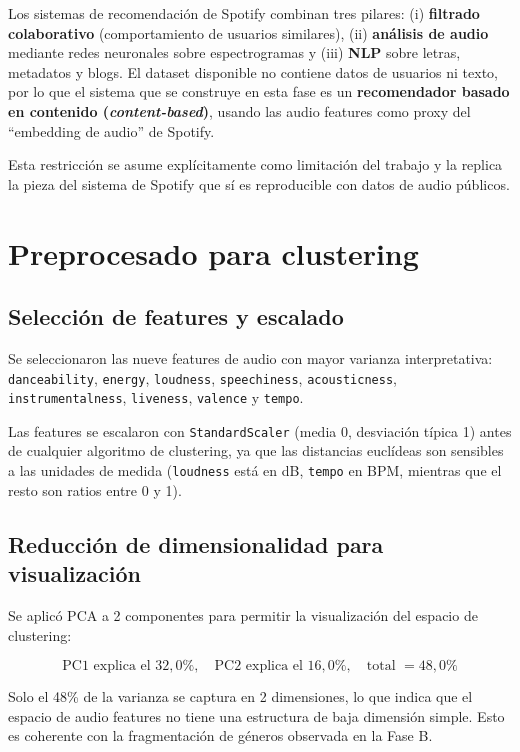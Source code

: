 \documentclass[12pt, a4paper, twoside]{book}
\theoremstyle{definition}
\begin{document}
Los sistemas de recomendación de Spotify combinan tres pilares:
(i) \textbf{filtrado colaborativo} (comportamiento de usuarios similares),
(ii) \textbf{análisis de audio} mediante redes neuronales sobre espectrogramas
y (iii) \textbf{NLP} sobre letras, metadatos y blogs. El dataset disponible
no contiene datos de usuarios ni texto, por lo que el sistema que se construye
en esta fase es un \textbf{recomendador basado en contenido (\textit{content-based})},
usando las audio features como proxy del ``embedding de audio'' de Spotify.

Esta restricción se asume explícitamente como limitación del trabajo y la replica
la pieza del sistema de Spotify que sí es reproducible con datos de audio públicos.

\section{Preprocesado para clustering}

\subsection{Selección de features y escalado}

Se seleccionaron las nueve features de audio con mayor varianza interpretativa:
\texttt{danceability}, \texttt{energy}, \texttt{loudness}, \texttt{speechiness},
\texttt{acousticness}, \texttt{instrumentalness}, \texttt{liveness},
\texttt{valence} y \texttt{tempo}.

Las features se escalaron con \texttt{StandardScaler} (media 0, desviación
típica 1) antes de cualquier algoritmo de clustering, ya que las distancias
euclídeas son sensibles a las unidades de medida (\texttt{loudness} está en
dB, \texttt{tempo} en BPM, mientras que el resto son ratios entre 0 y 1).

\subsection{Reducción de dimensionalidad para visualización}

Se aplicó PCA a 2 componentes para permitir la visualización del espacio de
clustering:

$$\text{PC1 explica el } 32{,}0\%, \quad \text{PC2 explica el } 16{,}0\%, \quad
\text{total } = 48{,}0\%$$

Solo el 48\% de la varianza se captura en 2 dimensiones, lo que indica que
el espacio de audio features no tiene una estructura de baja dimensión
simple. Esto es coherente con la fragmentación de géneros observada en la
Fase B.
\end{document}
